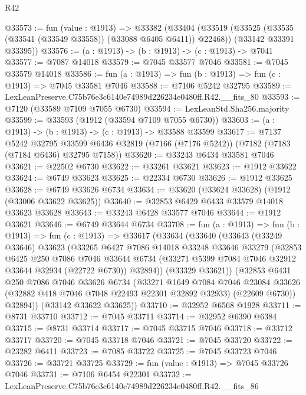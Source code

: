 \begin{lexlean}{R42}
\begin{coremodule}
{@33573 := fun (value : @1913) =>
  @33382
    (@33404
      (@33519 (@33525 (@33535 (@33541 (@33549 @33558)) (@33088 @6405 @6411)) @22468))
      (@33142 @33391 @33395))
@33576 := (a : @1913) -> (b : @1913) -> (c : @1913) -> @7041
@33577 := @7087 @14018
@33579 := @7045 @33577 @7046
@33581 := @7045 @33579 @14018
@33586 := fun (a : @1913) => fun (b : @1913) => fun (c : @1913) => @7045 @33581 @7046
@33588 := @7106 @5242 @32795
@33589 := LexLeanPreserve.C75b76e3c6140e74989d226234e0480ff.R42.__fits_80
@33593 := @7120 (@33589 @7109 @7055 @6730)
@33594 := LexLeanStd.Sha256.majority
@33599 := @33593 (@1912 (@33594 @7109 @7055 @6730))
@33603 := (a : @1913) -> (b : @1913) -> (c : @1913) -> @33588 @33599
@33617 := @7137
    @5242
    @32795
    @33599
    @6436
    @32819
    (@7166 (@7176 @5242))
    (@7182 (@7183 (@7184 @6436) @32795 @7158))
@33620 := @33243 @6434 @33581 @7046
@33621 := @22502 @6730
@33622 := @33261 @33621
@33623 := @1912 @33622
@33624 := @6749 @33623
@33625 := @22334 @6730
@33626 := @1912 @33625
@33628 := @6749 @33626 @6734
@33634 := @33620 (@33624 @33628) (@1912 (@33006 @33622 @33625))
@33640 := @32853 @6429 @6433 @33579 @14018 @33623 @33628
@33643 := @33243 @6428 @33577 @7046
@33644 := @1912 @33621
@33646 := @6749 @33644 @6734
@33708 := fun (a : @1913) =>
  fun (b : @1913) =>
  fun (c : @1913) =>
  @33617
    (@33634
      (@33640
        (@33643
          (@33249 @33646)
          @33623
          (@33265
            @6427
            @7086
            @14018
            @33248
            @33646
            @33279
            (@32853
              @6425
              @250
              @7086
              @7046
              @33644
              @6734
              (@33271 @5399 @7084 @7046 @32912 @33644 @32934 (@22722 @6730))
              @32894))
          (@33329 @33621))
        (@32853
          @6431
          @250
          @7086
          @7046
          @33626
          @6734
          (@33271
            @1649
            @7084
            @7046
            @23084
            @33626
            (@32882 @418 @7046 @7048 @22493 @22301 @32892 @32933)
            (@22609 @6730))
          @32894))
      (@33142 @33622 @33625))
@33710 := @32952 @6568 @1928
@33711 := @8731 @33710
@33712 := @7045 @33711
@33714 := @32952 @6390 @6384
@33715 := @8731 @33714
@33717 := @7045 @33715 @7046
@33718 := @33712 @33717
@33720 := @7045 @33718 @7046
@33721 := @7045 @33720
@33722 := @23282 @6411
@33723 := @7085 @33722
@33725 := @7045 @33723 @7046
@33726 := @33721 @33725
@33729 := fun (value : @1913) => @7045 @33726 @7046
@33731 := @7106 @6454 @22301
@33732 := LexLeanPreserve.C75b76e3c6140e74989d226234e0480ff.R42.__fits_86
}
\end{coremodule}
\end{lexlean}
